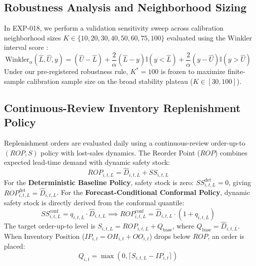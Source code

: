\documentclass[11pt,a4paper]{article}
\begin{document}
\subsection{Robustness Analysis and Neighborhood Sizing}
\label{sec:meth_robustness}
In EXP-018, we perform a validation sensitivity sweep across calibration neighborhood sizes $K \in \{10, 20, 30, 40, 50, 60, 75, 100\}$ evaluated using the Winkler interval score \cite{gneiting2007strictly}:
\begin{equation}
\text{Winkler}_{\alpha}(\hat{L}, \hat{U}, y) = (\hat{U} - \hat{L}) + \frac{2}{\alpha}(\hat{L} - y)\mathbb{I}(y < \hat{L}) + \frac{2}{\alpha}(y - \hat{U})\mathbb{I}(y > \hat{U})
\label{eq:winkler_score}
\end{equation}
Under our pre-registered robustness rule, $K^* = 100$ is frozen to maximize finite-sample calibration sample size on the broad stability plateau ($K \in [30, 100]$).

\subsection{Continuous-Review Inventory Replenishment Policy}
\label{sec:meth_inventory_policy}
Replenishment orders are evaluated daily using a continuous-review order-up-to $(ROP, S)$ policy with lost-sales dynamics. The Reorder Point ($ROP$) combines expected lead-time demand with dynamic safety stock:
\begin{equation}
ROP_{i,t,L} = \hat{D}_{i,t,L} + SS_{i,t,L}
\label{eq:rop_def}
\end{equation}
For the \textbf{Deterministic Baseline Policy}, safety stock is zero: $SS_{i,t,L}^{\text{det}} = 0$, giving $ROP_{i,t,L}^{\text{det}} = \hat{D}_{i,t,L}$.  
For the \textbf{Forecast-Conditional Conformal Policy}, dynamic safety stock is directly derived from the conformal quantile:
\begin{equation}
SS_{i,t,L}^{\text{conf}} = q_{i,t,L} \cdot \hat{D}_{i,t,L} \implies ROP_{i,t,L}^{\text{conf}} = \hat{D}_{i,t,L} \cdot (1 + q_{i,t,L})
\label{eq:rop_conf}
\end{equation}
The target order-up-to level is $S_{i,t,L} = ROP_{i,t,L} + Q_{\text{base}}$, where $Q_{\text{base}} = \hat{D}_{i,t,L}$. When Inventory Position ($IP_{i,t} = OH_{i,t} + OO_{i,t}$) drops below $ROP$, an order is placed:
\begin{equation}
Q_{i,t} = \max\left(0, \lceil S_{i,t,L} - IP_{i,t} \rceil\right)
\label{eq:order_quantity}
\end{equation}
\end{document}
